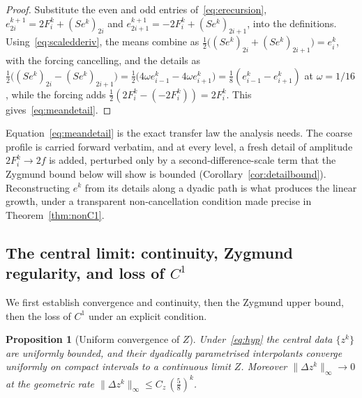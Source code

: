 \documentclass{article}
\theoremstyle{plain}
\newtheorem{proposition}[theorem]{Proposition}
\theoremstyle{definition}
\newcommand{\norm}[1]{\lVert #1 \rVert}
\begin{document}
\begin{proof}
Substitute the even and odd entries of~\eqref{eq:erecursion},
$e_{2i}^{k+1}=2F_i^k+(Se^k)_{2i}$ and $e_{2i+1}^{k+1}=-2F_i^k+(Se^k)_{2i+1}$,
into the definitions. Using~\eqref{eq:scaledderiv}, the means combine as
$\tfrac12\bigl((Se^k)_{2i}+(Se^k)_{2i+1}\bigr)=e_i^k$, with the forcing
cancelling, and the details as
$\tfrac12\bigl((Se^k)_{2i}-(Se^k)_{2i+1}\bigr)
=\tfrac12\bigl(4\omega e_{i-1}^k-4\omega e_{i+1}^k\bigr)
=\tfrac18(e_{i-1}^k-e_{i+1}^k)$ at $\omega=1/16$, while the forcing adds
$\tfrac12(2F_i^k-(-2F_i^k))=2F_i^k$. This gives~\eqref{eq:meandetail}.
\end{proof}

Equation~\eqref{eq:meandetail} is the exact transfer law the analysis needs. The
coarse profile is carried forward verbatim, and at every level, a fresh detail of
amplitude $2F_i^k\to 2f$ is added, perturbed only by a second-difference-scale
term that the Zygmund bound below will show is bounded
(Corollary~\ref{cor:detailbound}). Reconstructing $e^k$ from its details along a
dyadic path is what produces the linear growth, under a transparent
non-cancellation condition made precise in Theorem~\ref{thm:nonC1}.

\subsection{The central limit: continuity, Zygmund regularity, and loss of $C^1$}\label{sec:negative}

We first establish convergence and continuity, then the Zygmund upper bound,
then the loss of $C^1$ under an explicit condition.

\begin{proposition}[Uniform convergence of $Z$]\label{prop:zconv}
Under~\eqref{eq:hyp} the central data $\{z^k\}$ are uniformly bounded, and their
dyadically parametrised interpolants converge uniformly on compact intervals to
a continuous limit $Z$. Moreover $\norm{\Delta z^k}_\infty\to0$ at the
geometric rate $\norm{\Delta z^k}_\infty\leq C_z\,(\tfrac58)^k$.
\end{proposition}
\end{document}
